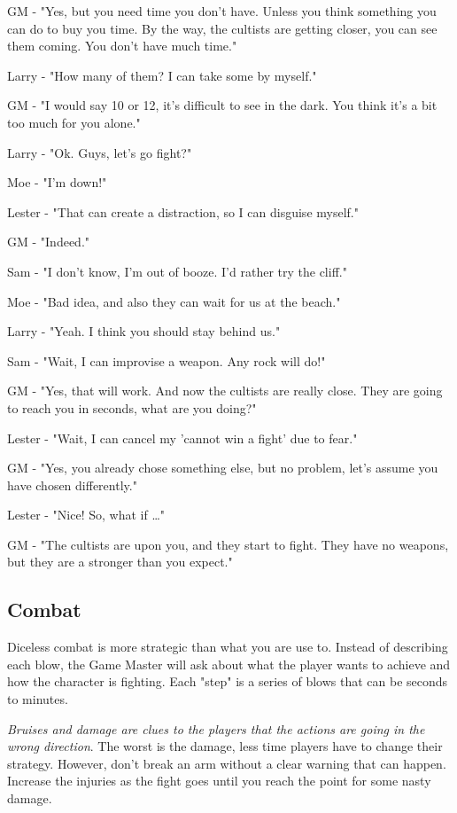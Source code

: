 \documentclass[11pt]{article}
\begin{document}
GM - "Yes, but you need time you don't have. Unless you think something you can do to buy you time. By the way, the cultists are getting closer, you can see them coming. You don't have much time."

Larry - "How many of them? I can take some by myself."

GM - "I would say 10 or 12, it's difficult to see in the dark. You think it's a bit too much for you alone."

Larry - "Ok. Guys, let's go fight?"

Moe - "I'm down!"

Lester - "That can create a distraction, so I can disguise myself."

GM - "Indeed."

Sam - "I don't know, I'm out of booze. I'd rather try the cliff."

Moe - "Bad idea, and also they can wait for us at the beach."

Larry - "Yeah. I think you should stay behind us."

Sam - "Wait, I can improvise a weapon. Any rock will do!"

GM - "Yes, that will work. And now the cultists are really close. They are going to reach you in seconds, what are you doing?"

Lester - "Wait, I can cancel my 'cannot win a fight' due to fear."

GM - "Yes, you already chose something else, but no problem, let's assume you have chosen differently."

Lester - "Nice! So, what if \ldots{}"

GM - "The cultists are upon you, and they start to fight. They have no weapons, but they are a stronger than you expect."

\subsection{Combat}
\label{sec:orge74e7bb}
Diceless combat is more strategic than what you are use to. Instead of describing each blow, the Game Master will ask about what the player wants to achieve and how the character is fighting. Each "step" is a series of blows that can be seconds to minutes.

\textit{Bruises and damage are clues to the players that the actions are going in the wrong direction}. The worst is the damage, less time players have to change their strategy. However, don't break an arm without a clear warning that can happen. Increase the injuries as the fight goes until you reach the point for some nasty damage.
\end{document}
